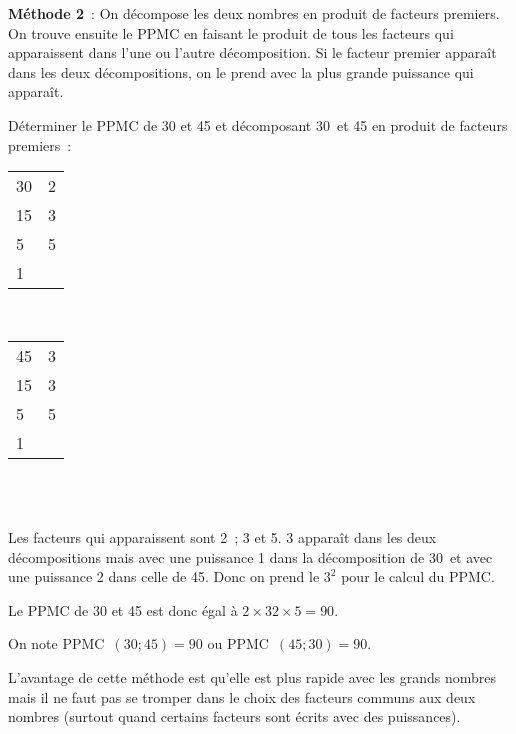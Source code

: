 \begin{methode*1}
 \vspace{0.5cm}
 
 \textcolor{H1}{\textbf{Méthode 2}} : On décompose les deux nombres en produit de facteurs premiers. On trouve ensuite le PPMC en faisant le produit de tous les facteurs qui apparaissent dans l'une ou l'autre décomposition. Si le facteur premier apparaît dans les deux décompositions, on le prend avec la plus grande puissance qui apparaît.
 
\begin{exemple*1}
Déterminer le PPMC de 30 et 45 et décomposant 30 et 45 en produit de facteurs premiers : \\[1em]
\begin{minipage}[t]{0.26\textwidth}
 \begin{tabularx}{0.3\textwidth}{X|X}
 30 & 2 \\ 
 15 & 3 \\
 5 & 5 \\
 1 & \\ 
 \end{tabularx} \\[1em]
\end{minipage} \hfill%
\begin{minipage}[t]{0.56\textwidth}
 \begin{tabularx}{0.3\textwidth}{X|X}
 45 & 3 \\ 
 15 & 3 \\
 5 & 5 \\
 1 & \\ 
 \end{tabularx} \\[1em]
 \end{minipage} \\
Les facteurs qui apparaissent sont 2 ; 3 et 5. 3 apparaît dans les deux décompositions mais avec une puissance 1 dans la décomposition de 30 et avec une puissance 2 dans celle de 45. Donc on prend le $3^2$ pour le calcul du PPMC.

Le PPMC de 30 et 45 est donc égal à $2 × 32 × 5 = 90$.

On note PPMC $(30 ; 45) = 90$ ou PPMC $(45 ; 30) = 90$. \\[-2em]
 \end{exemple*1}
 
\begin{remarque}
L'avantage de cette méthode est qu'elle est plus rapide avec les grands nombres mais il ne faut pas se tromper dans le choix des facteurs communs aux deux nombres (surtout quand certains facteurs sont écrits avec des puissances).
 \end{remarque}
 


\end{methode*1}

